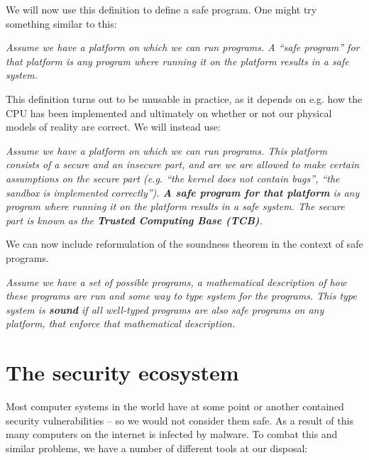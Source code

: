 We will now use this definition to define a safe program. One might try
something similar to this:

\vspace{0.3cm}
\begin{addmargin}{1cm}
  {\it Assume we have a platform on which we can run programs. A ``safe
    program'' for that platform is any program where running it on the platform
    results in a safe system.}
\end{addmargin}
\vspace{0.3cm}

This definition turns out to be unusable in practice, as it depends on e.g. how
the CPU has been implemented and ultimately on whether or not our physical
models of reality are correct. We will instead use:

\vspace{0.3cm}
\begin{addmargin}{1cm}
  {\it Assume we have a platform on which we can run programs. This platform
    consists of a secure and an insecure part, and are we are allowed to make
    certain assumptions on the secure part (e.g. ``the kernel does not contain
    bugs'', ``the sandbox is implemented correctly''). \textbf{A safe program
      for that platform} is any program where running it on the platform results
    in a safe system. The secure part is known as the \textbf{Trusted Computing
      Base (TCB)}.}
\end{addmargin}
\vspace{0.3cm}

We can now include reformulation of the soundness theorem in the context of safe
programs.

\vspace{0.3cm}
\begin{addmargin}{1cm}
  {\it Assume we have a set of possible programs, a mathematical description of
    how these programs are run and some way to type system for the
    programs. This type system is \textbf{sound} if all well-typed programs are
    also safe programs on any platform, that enforce that mathematical
    description.}
\end{addmargin}
\vspace{0.3cm}

\section{The security ecosystem}

Most computer systems in the world have at some point or another contained
security vulnerabilities -- so we would not consider them safe. As a result of
this many computers on the internet is infected by malware. To combat this and
similar problems, we have a number of different tools at our disposal:

